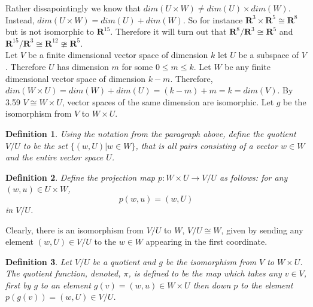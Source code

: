 \documentclass{article}
\theoremstyle{problemstyle}
\newtheorem{definition}{Definition}
\begin{document}
Rather dissapointingly we know that $dim(U \times W) \neq dim(U) \times dim(W)$. Instead, $dim(U \times W) = dim(U)+dim(W)$. So for instance $\textbf{R}^3 \times \textbf{R}^5 \cong \textbf{R}^8$ but is not isomorphic to $\textbf{R}^{15}$. Therefore it will turn out that $\textbf{R}^8\textbf{/}\textbf{R}^3 \cong \textbf{R}^5$ and $\textbf{R}^{15}\textbf{/}\textbf{R}^3 \cong \textbf{R}^{12} \ncong \textbf{R}^5$.\\ 

Let $V$ be a finite dimensional vector space of dimension $k$ let $U$ be a subspace of $V$. Therefore $U$ has dimension $m$ for some  $0 \leq m \leq k$. Let $W$ be any finite dimensional vector space of dimension $k-m$. Therefore, $dim(W \times U) = dim(W)+dim(U) = (k - m) + m = k = dim(V)$. By 3.59 $V \cong W \times U$, vector spaces of the same dimension are isomorphic. Let $g$ be the isomorphism from $V$ to $W \times U$. 

\begin{definition}
Using the notation from the paragraph above, define the quotient $V/U$ to be the set $\{(w,U)|w \in W\}$, that is all pairs consisting of a vector $w \in W$ and the entire vector space $U$.  
\end{definition}

\begin{definition}
Define the projection map $p: W \times U \rightarrow V/U$ as follows: for any $(w,u) \in U \times W$, $$p(w,u) = (w,U)$$ in $V/U$.
\end{definition}

Clearly, there is an isomorphism from $V/U$ to $W$, $V/U \cong W$, given by sending any element $(w,U) \in V/U$ to the $w \in W$ appearing in the first coordinate. 

\begin{definition}
Let $V/U$ be a quotient and $g$ be the isomorphism from $V$ to $W \times U$. The quotient function, denoted, $\pi$, is defined to be the map which takes any $v \in V$, first by $g$ to an element  $g(v) = (w,u) \in W\times U$ then down $p$ to the element $p(g(v)) = (w,U) \in V/U$.

\begin{center}
\end{center}
\end{definition}
\end{document}
